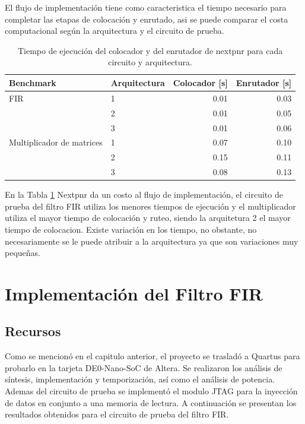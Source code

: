 El flujo de implementación tiene como caracteristica el tiempo necesario para completar las etapas de colocación y enrutado, asi se puede comparar el costa computacional según la arquitectura y el circuito de prueba.

\begin{table}[H]
  \centering
  \caption{Tiempo de ejecución del colocador y del enrutador de nextpnr para cada circuito y arquitectura.}
  \label{tab:tiempos}
  \begin{tabular}{llrr}
    \toprule
    Benchmark & Arquitectura & Colocador [s] & Enrutador [s] \\
    \midrule
    FIR & 1 & 0.01 & 0.03 \\
        & 2 & 0.01 & 0.05 \\
        & 3 & 0.01 & 0.06 \\
    \midrule
    Multiplicador de matrices & 1 & 0.07 & 0.10 \\
        & 2 & 0.15 & 0.11 \\
        & 3 & 0.08 & 0.13 \\
    \bottomrule
  \end{tabular}
\end{table}

En la Tabla \ref{tab:tiempos} Nextpnr da un costo al flujo de implementación, el circuito de prueba del filtro FIR utiliza los menores tiempos de ejecución y el multiplicador utiliza el mayor tiempo de colocación y ruteo, siendo la arquitetura 2 el mayor tiempo de colocacion. Existe variación en los tiempo, no obstante, no necesariamente se le puede atribuir a la arquitectura ya que son variaciones muy pequeñas.

\section{Implementación del Filtro FIR}



\subsection{Recursos}
Como se mencionó en el capitulo anterior, el proyecto se trasladó a Quartus\textregistered{} para probarlo en la tarjeta DE0-Nano-SoC de Altera\textregistered{}. Se realizaron los análisis de síntesis, implementación y temporización, así como el análisis de potencia. Ademas del circuito de prueba se implementó el modulo JTAG para la inyección de datos en conjunto a una memoria de lectura. A continuación se presentan los resultados obtenidos para el circuito de prueba del filtro FIR.

